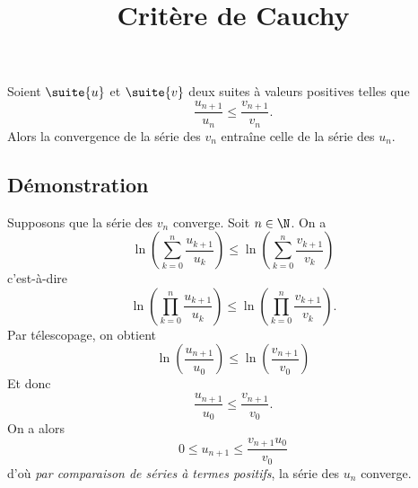 \documentclass[fontsize=12pt,twoside=false,parskip=half, french]{scrartcl}
\title{Critère de Cauchy}
\date{}
\author{}
\begin{document}
\maketitle
   \begin{Theoreme}
      Soient $\suite{u}$ et $\suite{v}$ deux suites à valeurs positives telles que 
      \[
         \frac{u_{n + 1}}{u_n} \leq \frac{v_{n + 1}}{v_n}.
      \]
      Alors la convergence de la série des $v_n$ entraîne celle de la série des $u_n$.
   \end{Theoreme}
   \subsection{Démonstration}
      Supposons que la série des $v_n$ converge. Soit $n \in \N$. On a
      \[
         \ln \left( \sum_{k = 0}^n \frac{u_{k + 1}}{u_k} \right) \leq \ln \left( \sum_{k = 0}^n \frac{v_{k + 1}}{v_k} \right)
      \]
      c’est-à-dire
      \[
        \ln \left(\prod_{k = 0}^n \frac{u_{k + 1}}{u_k} \right) \leq \ln \left(\prod_{k = 0}^n\frac{v_{k + 1}}{v_k} \right).
      \]
      Par télescopage, on obtient
      \[
         \ln\left(\frac{u_{n + 1}}{u_0}\right) \leq \ln\left(\frac{v_{n + 1}}{v_0}\right)
      \]
      Et donc 
      \[
         \frac{u_{n + 1}}{u_0} \leq \frac{v_{n + 1}}{v_0}.
      \]
      On a alors
      \[
         0 \leq u_{n + 1} \leq \frac{v_{n + 1} u_0}{v_0}
      \]
      d’où \emph{par comparaison de séries à termes positifs}, la série des $u_n$ converge.
\end{document}

